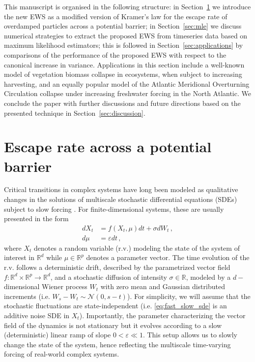 \documentclass[10pt]{article}
\newcommand{\sref}[1]{Section~\ref{#1}}
\begin{document}
This manuscript is organised in the following structure: in \sref{sec:escape_rate} we introduce the new EWS as a modified version of Kramer's law for the escape rate of overdamped particles across a potential barrier; 
in \sref{sec:mle} we discuss numerical strategies to extract the proposed EWS from timeseries data based on maximum likelihood estimators; 
this is followed in \sref{sec:applications} by comparisons of the performance of the proposed EWS with respect to the canonical increase in variance.
Applications in this section include a well-known model of vegetation biomass collapse in ecosystems, when subject to increasing harvesting, and an equally popular model of the Atlantic Meridional Overturning Circulation collapse under increasing freshwater forcing in the North Atlantic. 
We conclude the paper with further discussions and future directions based on the presented technique in \sref{sec:discussion}.

\section{Escape rate across a potential barrier}\label{sec:escape_rate}
Critical transitions in complex systems have long been modeled as qualitative changes in the solutions of multiscale stochastic differential equations (SDEs) subject to slow forcing \cite{Kuehn2011}.
For finite-dimensional systems, these are usually presented in the form
%
\begin{equation}
        \begin{aligned}\label{eq:fast_slow_sde}
                dX_{t} &= f(X_{t},\mu)dt + \sigma dW_{t}\,,\\
                d\mu &= \varepsilon dt\,,
        \end{aligned}
\end{equation}
%
where $X_t$ denotes a random variable (r.v.) modeling the state of the system of interest in $\mathbb{R}^{d}$ while $\mu\in \mathbb{R}^{p}$ denotes a parameter vector.
The time evolution of the r.v. follows a deterministic drift, described by the parametrized vector field $f:\mathbb{R}^{d}\times \mathbb{R}^{p}\to \mathbb{R}^{d}$, and a stochastic diffusion of intensity $\sigma\in\mathbb{R}$, modeled by a $d-$dimensional Wiener process $W_{t}$ with zero mean and Gaussian distributed increments (i.e. $W_{s} - W_{t}\sim\mathcal{N}(0,s-t)$).
For simplicity, we will assume that the stochastic fluctuations are state-independent (i.e. \eqref{eq:fast_slow_sde} is an additive noise SDE in $X_t$).
Importantly, the parameter characterizing the vector field of the dynamics is not stationary but it evolves according to a slow (deterministic) linear ramp of slope $0 < \varepsilon \ll 1$.
This setup allows us to slowly change the state of the system, hence reflecting the multiscale time-varying forcing of real-world complex systems.
\end{document}
